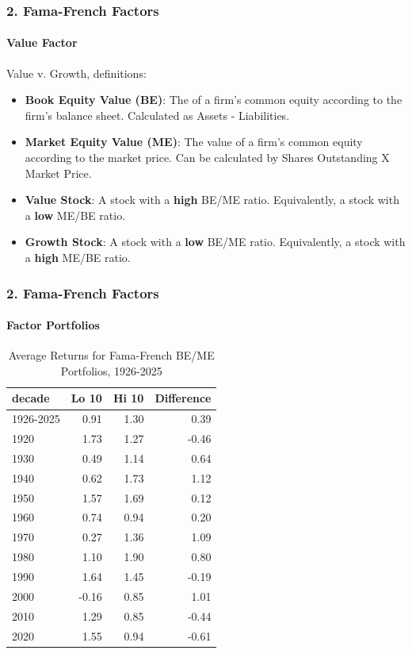 \documentclass{beamer}
\begin{document}
\begin{frame}[t]
    \frametitle{2. Fama-French Factors}
    \framesubtitle{Value Factor}

    Value v. Growth, definitions:
    \begin{itemize}
    \item \textbf{Book Equity Value (BE)}: The of a firm's common equity according to the firm's balance sheet. 
    Calculated as Assets - Liabilities. \\
    \item \textbf{Market Equity Value (ME)}: The value of a firm's common equity according to the market price.
    Can be calculated by Shares Outstanding X Market Price.\\
    \item \textbf{Value Stock}: A stock with a \textbf{high} BE/ME ratio.  Equivalently, a stock with a \textbf{low} ME/BE ratio.\\
    \item \textbf{Growth Stock}: A stock with a \textbf{low} BE/ME ratio.   Equivalently, a stock with a \textbf{high} ME/BE ratio.\\
    \end{itemize}

\end{frame}


\begin{frame}[t]
    \frametitle{2. Fama-French Factors}
    \framesubtitle{Factor Portfolios}

    \footnotesize
    \vspace{-2em}

    \begin{table}
    \caption{Average Returns for Fama-French BE/ME Portfolios, 1926-2025}
    \begin{tabular}{lrrr}
    \toprule
    decade & Lo 10 & Hi 10 & Difference \\
    \midrule
    1926-2025 & 0.91 & 1.30 & 0.39 \\
    \midrule
    1920 & 1.73 & 1.27 & -0.46 \\
    1930 & 0.49 & 1.14 & 0.64 \\
    1940 & 0.62 & 1.73 & 1.12 \\
    1950 & 1.57 & 1.69 & 0.12 \\
    1960 & 0.74 & 0.94 & 0.20 \\
    1970 & 0.27 & 1.36 & 1.09 \\
    1980 & 1.10 & 1.90 & 0.80 \\
    1990 & 1.64 & 1.45 & -0.19 \\
    2000 & -0.16 & 0.85 & 1.01 \\
    2010 & 1.29 & 0.85 & -0.44 \\
    2020 & 1.55 & 0.94 & -0.61 \\
    \bottomrule
    \end{tabular}
    \end{table}


\end{frame}
\end{document}
